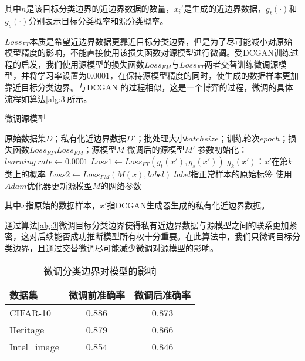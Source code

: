 \noindent 其中$n$是该目标分类边界的近边界数据的数量，$x_i'$是生成的近边界数据，$g_t(\cdot)$和$g_s(\cdot)$分别表示目标分类概率和源分类概率。

$Loss_{FT}$本质是希望近边界数据更靠近目标分类边界，但是为了尽可能减小对原始模型精度的影响，不能直接使用该损失函数对源模型进行微调。受DCGAN训练过程的启发，我们使用源模型的损失函数$Loss_{FM}$与$Loss_{FT}$两者交替训练微调源模型，并将学习率设置为0.0001，在保持源模型精度的同时，使生成的数据样本更加靠近目标分类边界。与DCGAN 的过程相似，这是一个博弈的过程，微调的具体流程如算法\ref{alg:3}所示。

\begin{algorithm}[H] 
	\caption{微调源模型}
	\label{alg:3}
	\begin{algorithmic}[1]
		
		\Require 原始数据集$D$；私有化近边界数据$D'$；批处理大小$batchsize$；训练轮次$epoch$；损失函数$Loss_{FT}$,$Loss_{FM}$；源模型$M$
		\Ensure 微调后的源模型$M'$
		\State 参数初始化：$learning \ rate \gets 0.0001$
		\State $Loss1 \gets Loss_{FT}(g_t(x') , g_s(x'))$ \Comment $g_k(x')$：$x'$在第$k$类上的概率
		\State $Loss2 \gets Loss_{FM}(M(x), label)$ \Comment $label$指正常样本的原始标签
		\State 使用$Adam$优化器更新源模型$M$的网络参数
		\EndFor
	\end{algorithmic}
\end{algorithm}

\noindent 其中$x$指原始的数据样本，$x'$指DCGAN生成器生成的私有化近边界数据。

通过算法\ref{alg:3}微调目标分类边界使得私有近边界数据与源模型之间的联系更加紧密，这对后续能否成功推断模型所有权十分重要。在此算法中，我们只微调目标分类边界，且通过交替微调尽可能减少微调对源模型的影响。

\begin{table}[h]
	\centering
	\setlength{\arrayrulewidth}{0.5mm}
	\renewcommand\arraystretch{1.8}
	\caption{微调分类边界对模型的影响}
	\label{table:state}
	\begin{tabular*}{13cm}{@{\extracolsep{\fill}} l c c}
		
		\hline
		数据集        &    微调前准确率   &   微调后准确率            \\
		\hline
		CIFAR-10      &     0.886        &     0.873               \\
		
		Heritage      &     0.879        &     0.866               \\
		
		Intel\_image  &     0.854        &     0.846               \\
		\hline		
	\end{tabular*}
\end{table}


